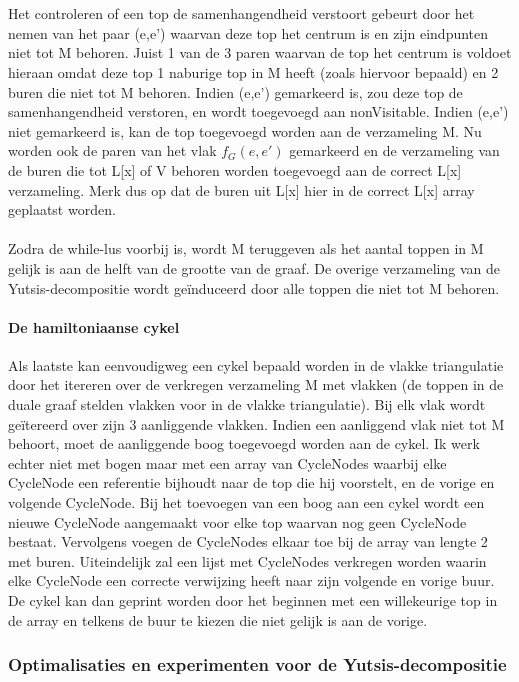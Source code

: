 \documentclass[11pt, a4paper, table]{article}
\theoremstyle{definition}
\theoremstyle{definition}
\theoremstyle{definition}
\begin{document}
	\\\\Het controleren of een top de samenhangendheid verstoort gebeurt door het nemen van het paar (e,e') waarvan deze top het centrum is en zijn eindpunten niet tot M behoren. Juist 1 van de 3 paren waarvan de top het centrum is voldoet hieraan omdat deze top 1 naburige top in M heeft (zoals hiervoor bepaald) en 2 buren die niet tot M behoren. 
	Indien (e,e') gemarkeerd is, zou deze top de samenhangendheid verstoren, en wordt toegevoegd aan nonVisitable. Indien (e,e') niet gemarkeerd is, kan de top toegevoegd worden aan de verzameling M. Nu worden ook de paren van het vlak $f_G(e,e')$ gemarkeerd en de verzameling van de buren die tot L[x] of V behoren worden toegevoegd aan de correct L[x] verzameling. Merk dus op dat de buren uit L[x] hier in de correct L[x] array geplaatst worden.
	\\\\Zodra de while-lus voorbij is, wordt M teruggeven als het aantal toppen in M gelijk is aan de helft van de grootte van de graaf. De overige verzameling van de Yutsis-decompositie wordt ge\"{i}nduceerd door alle toppen die niet tot M behoren. 
\paragraph{De hamiltoniaanse cykel}
	Als laatste kan eenvoudigweg een cykel bepaald worden in de vlakke triangulatie door het itereren over de verkregen verzameling M met vlakken (de toppen in de duale graaf stelden vlakken voor in de vlakke triangulatie). Bij elk vlak wordt ge\"{i}tereerd over zijn 3 aanliggende vlakken. Indien een aanliggend vlak niet tot M behoort, moet de aanliggende boog toegevoegd worden aan de cykel. Ik werk echter niet met bogen maar met een array van CycleNodes waarbij elke CycleNode een referentie bijhoudt naar de top die hij voorstelt, en de vorige en volgende CycleNode. Bij het toevoegen van een boog aan een cykel wordt een nieuwe CycleNode aangemaakt voor elke top waarvan nog geen CycleNode bestaat. Vervolgens voegen de CycleNodes elkaar toe bij de array van lengte 2 met buren. Uiteindelijk zal een lijst met CycleNodes verkregen worden waarin elke CycleNode een correcte verwijzing heeft naar zijn volgende en vorige buur. De cykel kan dan geprint worden door het beginnen met een willekeurige top in de array en telkens de buur te kiezen die niet gelijk is aan de vorige. 
	 
\subsubsection{Optimalisaties en experimenten voor de Yutsis-decompositie}
\end{document}
